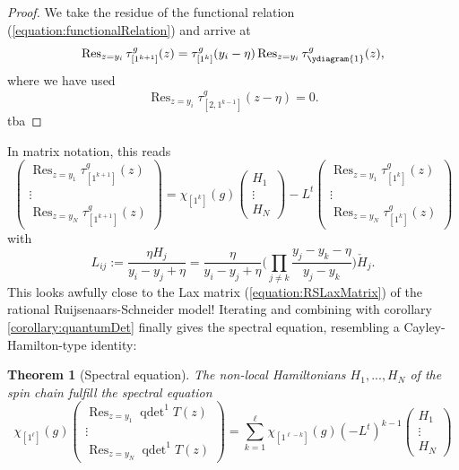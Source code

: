 \documentclass[11pt]{report}
\newtheorem{theorem}{Theorem}[section]
\theoremstyle{definition}
\theoremstyle{remark}
\theoremstyle{remark}
\begin{document}
\begin{proof}
We take the residue of the functional relation (\ref{equation:functionalRelation}) and arrive at
\begin{equation*}
\operatorname{Res}_{z=y_i} \tau_{[1^{k+1}]}^g(z)
= \tau_{[1^k]}^g(y_i-\eta) \operatorname{Res}_{z=y_i} \tau_{\ydiagram{1}}^g(z),
\end{equation*}
where we have used
\begin{equation*}
\operatorname{Res}_{z=y_i} \tau_{[2,1^{k-1}]}^g(z-\eta) = 0.
\end{equation*}
tba
\end{proof}

In matrix notation, this reads
\begin{equation*}
\begin{pmatrix}
\operatorname{Res}_{z=y_1} \tau_{[1^{k+1}]}^g(z) \\
\vdots \\
\operatorname{Res}_{z=y_N} \tau_{[1^{k+1}]}^g(z)
\end{pmatrix}
=
\chi_{[1^k]}(g)
\begin{pmatrix}
H_1 \\
\vdots \\
H_N
\end{pmatrix}
-L^t
\begin{pmatrix}
\operatorname{Res}_{z=y_1} \tau_{[1^k]}^g(z) \\
\vdots \\
\operatorname{Res}_{z=y_N} \tau_{[1^k]}^g(z)
\end{pmatrix}
\end{equation*}
with
\begin{equation*}
L_{ij} := \frac{\eta H_j}{y_i-y_j+\eta} = \frac{\eta}{y_i-y_j+\eta} \bigg( \prod_{j \neq k} \frac{y_j-y_k-\eta}{y_j-y_k} \bigg) \check H_j.
\end{equation*}
This looks awfully close to the Lax matrix (\ref{equation:RSLaxMatrix}) of the rational Ruijsenaars-Schneider model! Iterating and combining with corollary \ref{corollary:quantumDet} finally gives the spectral equation, resembling a Cayley-Hamilton-type identity:

\begin{theorem}[Spectral equation]\label{theorem:spectralEq}
The non-local Hamiltonians $H_1,...,H_N$ of the spin chain fulfill the \emph{spectral equation}
\begin{equation*}
\chi_{[1^\ell]}(g)
\begin{pmatrix}
\operatorname{Res}_{z=y_1} \operatorname{qdet}^1 T(z) \\ \vdots \\ \operatorname{Res}_{z=y_N} \operatorname{qdet}^1 T(z)
\end{pmatrix}
= \sum_{k=1}^\ell \chi_{[1^{\ell-k}]}(g) (-L^t)^{k-1}
\begin{pmatrix}
H_1 \\ \vdots \\ H_N
\end{pmatrix}
\end{equation*}
\end{theorem}
\end{document}
